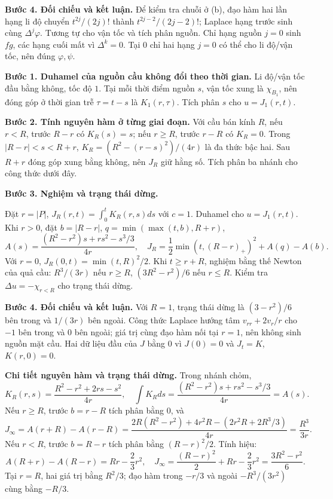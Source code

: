 \textbf{Bước 4. Đối chiếu và kết luận.} Để kiểm tra chuỗi ở (b), đạo hàm hai lần hạng li độ chuyển $t^{2j}/(2j)!$ thành $t^{2j-2}/(2j-2)!$; Laplace hạng trước sinh cùng $\Delta^j\varphi$. Tương tự cho vận tốc và tích phân nguồn. Chỉ hạng nguồn $j=0$ sinh $fg$, các hạng cuối mất vì $\Delta^k=0$. Tại $0$ chỉ hai hạng $j=0$ có thể cho li độ/vận tốc, nên đúng $\varphi,\psi$.

\textbf{Bước 1. Duhamel của nguồn cầu không đổi theo thời gian.} Li độ/vận tốc đầu bằng không, tốc độ $1$. Tại mỗi thời điểm nguồn $s$, vận tốc xung là $\chi_{B_1}$, nên đóng góp ở thời gian trễ $\tau=t-s$ là $K_1(r,\tau)$. Tích phân $s$ cho $u=J_1(r,t)$.

\textbf{Bước 2. Tính nguyên hàm ở từng giai đoạn.} Với cầu bán kính $R$, nếu $r<R$, trước $R-r$ có $K_R(s)=s$; nếu $r\ge R$, trước $r-R$ có $K_R=0$. Trong $|R-r|<s<R+r$, $K_R=(R^2-(r-s)^2)/(4r)$ là đa thức bậc hai. Sau $R+r$ đóng góp xung bằng không, nên $J_R$ giữ hằng số. Tích phân ba nhánh cho công thức dưới đây.

\textbf{Bước 3. Nghiệm và trạng thái dừng.}

Đặt $r=|P|$, $J_R(r,t)=\int_0^tK_R(r,s)ds$ với $c=1$. Duhamel cho $u=J_1(r,t)$. Khi $r>0$, đặt $b=|R-r|$, $q=\min(\max(t,b),R+r)$,
\[A(s)=\frac{(R^2-r^2)s+rs^2-s^3/3}{4r},\quad J_R=\frac12\min(t,(R-r)_+)^2+A(q)-A(b).\]
Với $r=0$, $J_R(0,t)=\min(t,R)^2/2$. Khi $t\ge r+R$, nghiệm bằng thế Newton của quả cầu: $R^3/(3r)$ nếu $r\ge R$, $(3R^2-r^2)/6$ nếu $r\le R$. Kiểm tra $\Delta u=-\chi_{r<R}$ cho trạng thái dừng.

\textbf{Bước 4. Đối chiếu và kết luận.} Với $R=1$, trạng thái dừng là $(3-r^2)/6$ bên trong và $1/(3r)$ bên ngoài. Công thức Laplace hướng tâm $v_{rr}+2v_r/r$ cho $-1$ bên trong và $0$ bên ngoài; giá trị cùng đạo hàm nối tại $r=1$, nên không sinh nguồn mặt cầu. Hai dữ liệu đầu của $J$ bằng $0$ vì $J(0)=0$ và $J_t=K$, $K(r,0)=0$.

\textbf{Chi tiết nguyên hàm và trạng thái dừng.} Trong nhánh chỏm,
\[K_R(r,s)=\frac{R^2-r^2+2rs-s^2}{4r},\quad
\int K_Rds=\frac{(R^2-r^2)s+rs^2-s^3/3}{4r}=A(s).\]
Nếu $r\ge R$, trước $b=r-R$ tích phân bằng $0$, và
\[J_\infty=A(r+R)-A(r-R)
=\frac{2R(R^2-r^2)+4r^2R-(2r^2R+2R^3/3)}{4r}
=\frac{R^3}{3r}.\]
Nếu $r<R$, trước $b=R-r$ tích phân bằng $(R-r)^2/2$. Tính hiệu:
\[A(R+r)-A(R-r)=Rr-\frac23r^2,\quad
J_\infty=\frac{(R-r)^2}{2}+Rr-\frac23r^2=\frac{3R^2-r^2}{6}.\]
Tại $r=R$, hai giá trị bằng $R^2/3$; đạo hàm trong $-r/3$ và ngoài $-R^3/(3r^2)$ cùng bằng $-R/3$.

